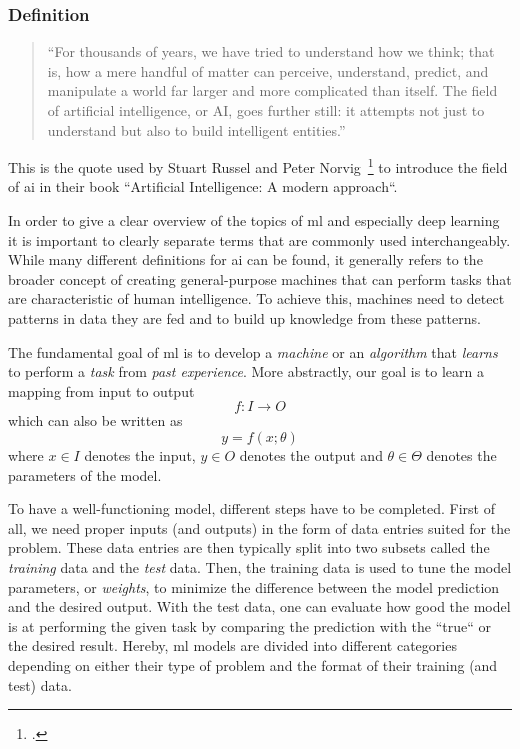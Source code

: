 \subsubsection{Definition}
\label{sub:definition}

\begin{quote}
``For thousands of years, we have tried to understand how we think; that is, how a mere handful of matter can perceive, understand, predict, and manipulate a world far larger and more complicated than itself. The field of artificial intelligence, or AI, goes further still: it attempts not just to understand but also to build intelligent entities.''
\end{quote}

This is the quote used by Stuart Russel and Peter Norvig~\footcite[3]{russell2016artificial} to introduce the field of \gls{ai} in their book “Artificial Intelligence: A modern approach“.

In order to give a clear overview of the topics of \gls{ml} and especially deep learning it is important to clearly separate terms that are commonly used interchangeably. While many different definitions for \gls{ai} can be found, it generally refers to the broader concept of creating general-purpose machines that can perform tasks that are characteristic of human intelligence. To achieve this, machines need to detect patterns in data they are fed and to build up knowledge from these patterns.

The fundamental goal of \gls{ml} is to develop a \textit{machine} or an \textit{algorithm} that \textit{learns} to perform a \textit{task} from \textit{past experience}. More abstractly, our goal is to learn a mapping from input to output
\begin{equation}
	f : I \rightarrow O
\end{equation}
which can also be written as
\begin{equation}
	y = f(x ; \theta)
\end{equation}
where $ x \in I $ denotes the input, $ y \in O $ denotes the output and $ \theta \in \Theta $ denotes the parameters of the model.

To have a well-functioning model, different steps have to be completed. First of all, we need proper inputs (and outputs) in the form of data entries suited for the problem. These data entries are then typically split into two subsets called the \textit{training} data and the \textit{test} data. Then, the training data is used to tune the model parameters, or \textit{weights}, to minimize the difference between the model prediction and the desired output. With the test data, one can evaluate how good the model is at performing the given task by comparing the prediction with the “true“ or the desired result. Hereby, \gls{ml} models are divided into different categories depending on either their type of problem and the format of their training (and test) data.

